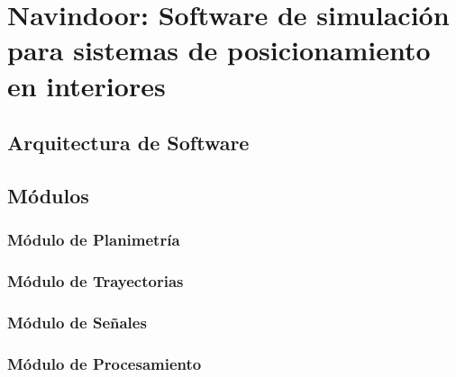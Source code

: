 \chapter{Navindoor: Software de simulación para sistemas de posicionamiento en interiores}

\section{Arquitectura de Software}

\section{Módulos}

\subsection{Módulo de Planimetría}
\subsection{Módulo de Trayectorias}
\subsection{Módulo de Señales}
\subsection{Módulo de Procesamiento}
